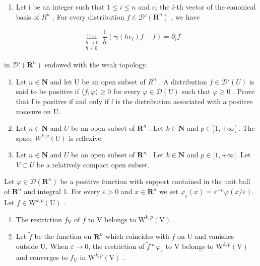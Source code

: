 \begin{enumerate}
\def\labelenumi{\alph{enumi})}
\setcounter{enumi}{4}
\tightlist
\item
  Let i be an integer such that \(1 \leqslant i \leqslant n\) and \(e_{i}\) the \(i\)-th vector of the canonical basis of \(R^{n}\) . For every distribution \(f \in \mathcal{D}'(\mathbf{R}^{n})\) , we have
\end{enumerate}

\[
\lim_{\substack{h\to 0\\ h\neq 0}}\frac{1}{h} (\boldsymbol {\gamma}(he_{i})f - f) = \partial_{i}f
\]

in \(\mathcal{D}'(\mathbf{R}^n)\) endowed with the weak topology.

\begin{enumerate}
\def\labelenumi{\arabic{enumi})}
\setcounter{enumi}{7}
\item
  Let \(n \in \mathbf{N}\) and let U be an open subset of \(R^{n}\) . A distribution \(f \in \mathcal{D}'(U)\) is said to be positive if \(\langle f, \varphi \rangle \geqslant 0\) for every \(\varphi \in \mathcal{D}(U)\) such that \(\varphi \geqslant 0\) . Prove that f is positive if and only if f is the distribution associated with a positive measure on U.
\item
  Let \(n \in \mathbf{N}\) and \(U\) be an open subset of \(\mathbf{R}^n\) . Let \(k \in \mathbf{N}\) and \(p \in ]1, +\infty[\) . The space \(W^{k,p}(U)\) is reflexive.
\item
  Let \(n \in \mathbf{N}\) and \(U\) be an open subset of \(\mathbf{R}^n\) . Let \(k \in \mathbf{N}\) and \(p \in [1, +\infty[\). Let \(V \subset U\) be a relatively compact open subset.
\end{enumerate}

Let \(\varphi \in \mathcal{D}(\mathbf{R}^n)\) be a positive function with support contained in the unit ball of \(\mathbf{R}^n\) and integral 1. For every \(\varepsilon > 0\) and \(x \in \mathbf{R}^n\) we set \(\varphi_{\varepsilon}(x) = \varepsilon^{-n}\varphi(x/\varepsilon)\). Let \(f \in \mathrm{W}^{k,p}(\mathrm{U})\) .

\begin{enumerate}
\def\labelenumi{\alph{enumi})}
\item
  The restriction \(f_{\mathrm{V}}\) of \(f\) to V belongs to \(\mathrm{W}^{k,p}(\mathrm{V})\) .
\item
  Let \(\widetilde{f}\) be the function on \(\mathbf{R}^n\) which coincides with \(f\) on U and vanishes outside U. When \(\varepsilon \to 0\), the restriction of \(\widetilde{f} * \varphi_{\varepsilon}\) to V belongs to \(\mathrm{W}^{k,p}(\mathrm{V})\) and converges to \(f_{\mathrm{V}}\) in \(\mathrm{W}^{k,p}(\mathrm{V})\) .
\end{enumerate}

